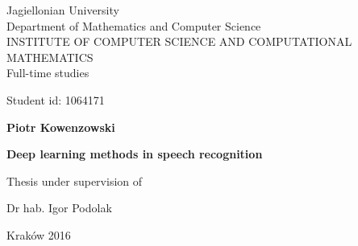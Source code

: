\begin{titlepage}
\begin{center}
Jagiellonian University \\
Department of Mathematics and Computer Science \\
{\large INSTITUTE OF COMPUTER SCIENCE AND COMPUTATIONAL MATHEMATICS} \\
Full-time studies \\
\end{center}

\vspace*{\fill}

Student id: 1064171

\vspace*{\fill}

\begin{center}
	{\Large\textbf{Piotr Kowenzowski}}

\vspace*{0.5cm}
{\Huge\textbf {Deep learning methods in speech recognition}}

\end{center}



\vspace*{\fill}

\begin{flushright}
Thesis under supervision of

Dr hab. Igor Podolak
\end{flushright}

\vspace*{\fill}

\begin{center}
	{\huge Kraków 2016}
\end{center}
\end{titlepage}
